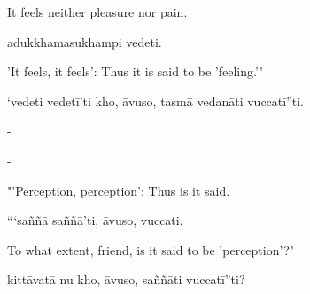 \begin{samepage}
\begin{leftcolumn*}
It feels neither pleasure nor pain.
\end{leftcolumn*}

\begin{rightcolumn}
adukkhamasukhampi vedeti.
\end{rightcolumn}
\end{samepage}

\begin{samepage}
\begin{leftcolumn*}
'It feels, it feels': Thus it is said to be 'feeling.'"
\end{leftcolumn*}

\begin{rightcolumn}
‘vedeti vedetī’ti kho, āvuso, tasmā vedanāti vuccatī”ti.
\end{rightcolumn}
\end{samepage}

\begin{samepage}
\begin{leftcolumn*}
-
\end{leftcolumn*}

\begin{rightcolumn}
-
\end{rightcolumn}
\end{samepage}

\begin{samepage}
\begin{leftcolumn*}
"'Perception, perception': Thus is it said.
\end{leftcolumn*}

\begin{rightcolumn}
“‘saññā saññā’ti, āvuso, vuccati.
\end{rightcolumn}
\end{samepage}

\begin{samepage}
\begin{leftcolumn*}
To what extent, friend, is it said to be 'perception'?"
\end{leftcolumn*}

\begin{rightcolumn}
kittāvatā nu kho, āvuso, saññāti vuccatī”ti?
\end{rightcolumn}
\end{samepage}

